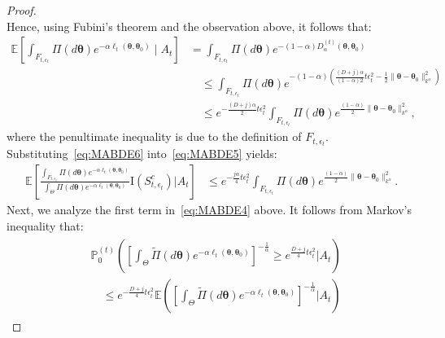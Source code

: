 \documentclass[final,12pt]{colt2026} %
\begin{document}
\begin{proof}
$$$$
Hence, using Fubini's theorem and the observation above, it follows that:
\begin{align}\label{eq:MABDE6}
\nonumber
\mathbb{E}\left[\int_{F_{t,\epsilon_t}} \Pi(d\pmb \theta) e^{-\alpha \ell_{t}(\pmb \theta,\pmb \theta_0)} \;\Big|\;A_t\right] &=\int_{F_{t,\epsilon_t}} \Pi(d\pmb \theta) e^{-(1-\alpha)  D_{\alpha}^{(t)}(\pmb \theta,\pmb \theta_0)}
     \\
\nonumber
&\quad \leq \int_{F_{t,\epsilon_t}} \Pi(d\pmb \theta) e^{-(1-\alpha)  \left(\frac{(D+j)\alpha}{(1-\alpha)2} t\epsilon_t^2  - \frac{1}{2} \|\pmb \theta-\pmb \theta_0\|_{k^\alpha}^2 \right)}
\\
&\quad \leq %
     e^{- \frac{(D+j) \alpha}{2}  t\epsilon_t^2 } \int_{F_{t,\epsilon_t}} \Pi(d\pmb \theta) e^{\frac{(1-\alpha) }{2} \|\pmb \theta-\pmb \theta_0\|_{k^\alpha}^2}, 
\end{align}
where the penultimate inequality is due to the definition of  $F_{t,\epsilon_t}$.
Substituting~\eqref{eq:MABDE6} into~\eqref{eq:MABDE5} yields:
\begin{align}
\mathbb{E} \left[  \frac{\int_{F_{t,\epsilon_t}} \Pi(d\pmb \theta) e^{-\alpha \ell_{t}(\pmb \theta,\pmb \theta_0)}} {\int_{\Theta} \Pi(d\pmb \theta) e^{-\alpha \ell_{t}(\pmb \theta,\pmb \theta_0)} } \text{I}(S_{t,\epsilon_t}^c)   \Big | A_t \right] %
&\leq e^{ -\frac{j \alpha }{4} t\epsilon_t^2 } \int_{F_{t, \epsilon_t}} \Pi(d\pmb \theta) e^{\frac{(1-\alpha) }{2} \|\pmb \theta-\pmb \theta_0\|_{k^\alpha}^2}.
\label{eq:MABDE7}
\end{align}
Next, we analyze the first term in~\eqref{eq:MABDE4} above.  It follows from Markov's inequality that:
\begin{align}\label{eq:MABDE8}
\begin{split}
&\mathbb{P}_0^{(t)} \left( \left[ \int_{\Theta} \tilde\Pi(d\pmb \theta) e^{-\alpha \ell_{t}(\pmb \theta,\pmb \theta_0)}\right]^{-\frac{1}{\alpha}} \geq e^{ \frac{D+j}{4} t\epsilon_t^2 } \Big | A_t \right)\\
&\quad \leq  {e^{ - \frac{D+j}{4} t\epsilon_t^2 } }\mathbb{E} \left( \left[ \int_{\Theta} \tilde \Pi(d\pmb \theta) e^{-\alpha \ell_{t}(\pmb \theta,\pmb \theta_0)} \right]^{-\frac{1}{\alpha}} \Big | A_t  \right)

\end{split}
\end{align}
\end{proof}
\end{document}
